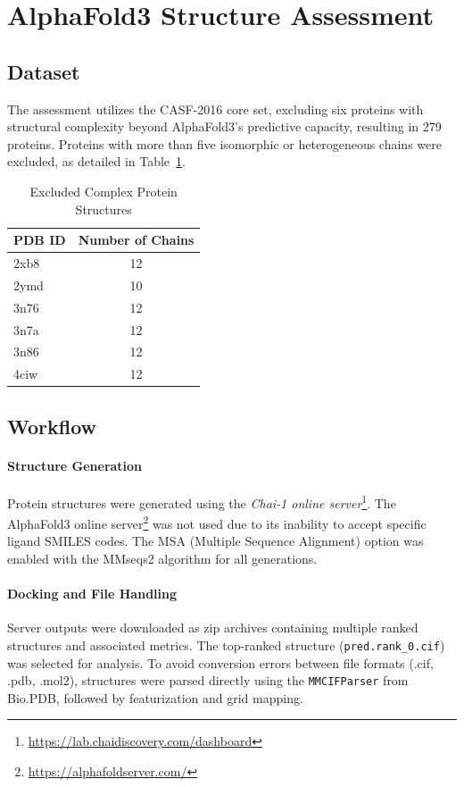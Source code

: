 \documentclass[unnumsec,webpdf,contemporary,large]{oup-authoring-template}
\theoremstyle{thmstyleone}%
\theoremstyle{thmstyletwo}%
\theoremstyle{thmstylethree}%
\begin{document}
\vspace{-1em}
\section{AlphaFold3 Structure Assessment}

\subsection{Dataset}
The assessment utilizes the CASF-2016 core set, excluding six proteins with structural complexity beyond AlphaFold3's predictive capacity, resulting in 279 proteins. Proteins with more than five isomorphic or heterogeneous chains were excluded, as detailed in Table~\ref{tab:complex}.
\vspace{-1em}
\begin{table}[H]
\centering
\caption{Excluded Complex Protein Structures}
\label{tab:complex}
\begin{tabular}{lc}
\toprule
PDB ID & Number of Chains \\
\midrule
2xb8 & 12 \\
2ymd & 10 \\
3n76 & 12 \\
3n7a & 12 \\
3n86 & 12 \\
4ciw & 12 \\
\bottomrule
\end{tabular}
\end{table}

\subsection{Workflow}
\vspace{0.5em}
\paragraph{Structure Generation}
Protein structures were generated using the \textit{Chai-1 online server}\footnote{\url{https://lab.chaidiscovery.com/dashboard}}. The AlphaFold3 online server\footnote{\url{https://alphafoldserver.com/}} was not used due to its inability to accept specific ligand SMILES codes. The MSA (Multiple Sequence Alignment) option was enabled with the MMseqs2 algorithm for all generations.

\paragraph{Docking and File Handling}
Server outputs were downloaded as zip archives containing multiple ranked structures and associated metrics. The top-ranked structure (\texttt{pred.rank\_0.cif}) was selected for analysis. To avoid conversion errors between file formats (.cif, .pdb, .mol2), structures were parsed directly using the \texttt{MMCIFParser} from Bio.PDB, followed by featurization and grid mapping.
\end{document}
